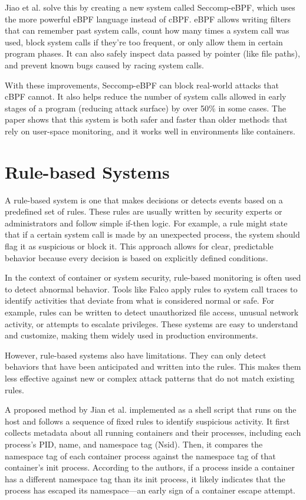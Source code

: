 \documentclass[12pt]{report}
\begin{document}
\begin{doublespace}
Jiao et al. \cite{jia2023programmable} solve this by creating a new system called Seccomp-eBPF, which uses the more powerful eBPF language instead of cBPF. eBPF allows writing filters that can remember past system calls, count how many times a system call was used, block system calls if they’re too frequent, or only allow them in certain program phases. It can also safely inspect data passed by pointer (like file paths), and prevent known bugs caused by racing system calls.

With these improvements, Seccomp-eBPF can block real-world attacks that cBPF cannot. It also helps reduce the number of system calls allowed in early stages of a program (reducing attack surface) by over 50\% in some cases. The paper shows that this system is both safer and faster than older methods that rely on user-space monitoring, and it works well in environments like containers.


\section{Rule-based Systems}

A rule-based system is one that makes decisions or detects events based on a predefined set of rules. These rules are usually written by security experts or administrators and follow simple if-then logic. For example, a rule might state that if a certain system call is made by an unexpected process, the system should flag it as suspicious or block it. This approach allows for clear, predictable behavior because every decision is based on explicitly defined conditions.

In the context of container or system security, rule-based monitoring is often used to detect abnormal behavior. Tools like Falco apply rules to system call traces to identify activities that deviate from what is considered normal or safe. For example, rules can be written to detect unauthorized file access, unusual network activity, or attempts to escalate privileges. These systems are easy to understand and customize, making them widely used in production environments.

However, rule-based systems also have limitations. They can only detect behaviors that have been anticipated and written into the rules. This makes them less effective against new or complex attack patterns that do not match existing rules.

A proposed method by Jian et al. \cite{jian2017defense} implemented as a shell script that runs on the host and follows a sequence of fixed rules to identify suspicious activity. It first collects metadata about all running containers and their processes, including each process’s PID, name, and namespace tag (Nsid). Then, it compares the namespace tag of each container process against the namespace tag of that container’s init process. According to the authors, if a process inside a container has a different namespace tag than its init process, it likely indicates that the process has escaped its namespace—an early sign of a container escape attempt.


\end{doublespace}
\end{document}
